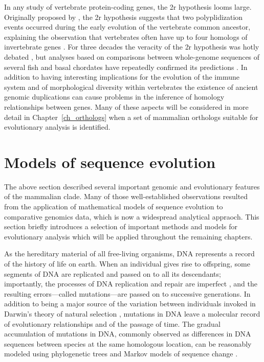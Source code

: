 In any study of vertebrate protein-coding genes, the \ac{2r}
hypothesis looms large. Originally proposed by \citet{Ohno1970}, the
\ac{2r} hypothesis suggests that two polyplidization events occurred
during the early evolution of the vertebrate common ancestor,
explaining the observation that vertebrates often have up to four
homologs of invertebrate genes \citep{Hokamp2003}. For three decades
the veracity of the \ac{2r} hypothesis was hotly debated
\citep{McLysaght2002,Dehal2005}, but analyses based on comparisons
between whole-genome sequences of several fish and basal chordates
have repeatedly confirmed its predictions
\citep{Kasahara2007,Putnam2008b}. In addition to having interesting
implications for the evolution of the immune system and of
morphological diversity within vertebrates
\citep{Hughes1997,Hoffmann1999,Peer2009b} the existence of ancient
genomic duplications can cause problems in the inference of homology
relationships between genes. Many of these aspects will be considered
in more detail in Chapter~\ref{ch_orthologs} when a set of mammalian
orthologs suitable for evolutionary analysis is identified.

\section{Models of sequence evolution}
\label{codon_intro}

The above section described several important genomic and evolutionary
features of the mammalian clade. Many of those well-established
observations resulted from the application of mathematical models of
sequence evolution to comparative genomics data, which is now a
widespread analytical appraoch. This section briefly introduces a
selection of important methods and models for evolutionary analysis
which will be applied throughout the remaining chapters.

As the hereditary material of all free-living organisms, DNA
represents a record of the history of life on earth. When an
individual gives rise to offspring, some segments of DNA are
replicated and passed on to all its descendants; importantly, the
processes of DNA replication and repair are imperfect
\citep{Arnheim2009}, and the resulting errors---called mutations---are
passed on to successive generations. In addition to being a major
source of the variation between individuals invoked in Darwin's theory
of natural selection \citep{Darwin1859a}, mutations in DNA leave a
molecular record of evolutionary relationships and of the passage of
time. The gradual accumulation of mutations in DNA, commonly observed
as differences in DNA sequences between species at the same homologous
location, can be reasonably modeled using phylogenetic trees and
Markov models of sequence change \citep{Yang2006}.

